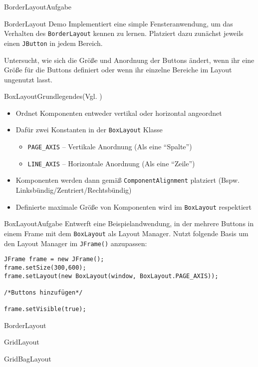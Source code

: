 \begin{frame}{BorderLayout}{Aufgabe}
    \begin{alertblock}{BorderLayout Demo}
    Implementiert eine simple Fensteranwendung, um das Verhalten des \texttt{BorderLayout} kennen zu lernen. Platziert dazu zunächst jeweils einen \texttt{JButton} in
    jedem Bereich. 
    
    Untersucht, wie sich die Größe und Anordnung der Buttons ändert, wenn ihr eine Größe für die Buttons definiert oder wenn ihr einzelne Bereiche im Layout ungenutzt lasst.
    \end{alertblock}
\end{frame}

\begin{frame}{BoxLayout}{Grundlegendes(Vgl. \cite{orac:boxlayout})}
    \begin{itemize}
        \item Ordnet Komponenten entweder vertikal oder horizontal angeordnet
        \item Dafür zwei Konstanten in der \texttt{BoxLayout} Klasse
        \begin{itemize}
            \item \texttt{PAGE_AXIS} -- Vertikale Anordnung (Als eine "`Spalte"')
            \item \texttt{LINE_AXIS} -- Horizontale Anordnung (Als eine "`Zeile"')
        \end{itemize}
        \item Komponenten werden dann gemäß \texttt{ComponentAlignment} platziert (Bspw. Linksbündig/Zentriert/Rechtsbündig)
        \item Definierte maximale Größe von Komponenten wird im \texttt{BoxLayout}  respektiert
    \end{itemize}
\end{frame}

\begin{frame}[fragile]{BoxLayout}{Aufgabe}
Entwerft eine Beispielandwendung, in der mehrere Buttons in einem Frame mit dem \texttt{BoxLayout} als Layout Manager. Nutzt folgende Basis um den Layout Manager im \texttt{JFrame()} anzupassen:

\lstset{style=java}
\begin{lstlisting}
JFrame frame = new JFrame();
frame.setSize(300,600);
frame.setLayout(new BoxLayout(window, BoxLayout.PAGE_AXIS));

/*Buttons hinzufügen*/

frame.setVisible(true);
\end{lstlisting}
\end{frame}

\begin{frame}{BorderLayout}{}
\end{frame}

\begin{frame}{GridLayout}{}
\end{frame}

\begin{frame}{GridBagLayout}{}
\end{frame}

